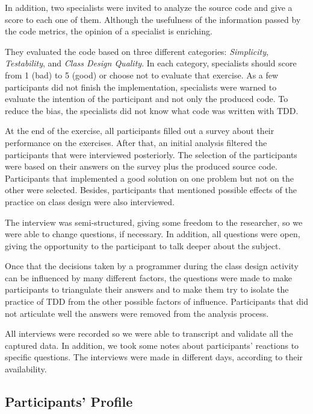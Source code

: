 \documentclass[conference]{IEEEtran}
\begin{document}
In addition, two specialists were invited to analyze the source code and give a score
to each one of them. Although the usefulness of the information passed by the code metrics,
the opinion of a specialist is enriching.

They evaluated the code based on three different categories: \textit{Simplicity}, \textit{Testability},
and \textit{Class Design Quality}. In each category, specialists should score from 1 (bad) to
5 (good) or choose not to evaluate that exercise. As a few participants did not finish the
implementation, specialists were warned to evaluate the intention of the participant and not
only the produced code.
To reduce the bias, the specialists did not know what code was written with TDD.

At the end of the exercise, all participants filled out a survey about their performance
on the exercises. After that, an initial analysis filtered the participants that
were interviewed posteriorly. The selection of the participants were based on
their answers on the survey plus the produced source code. Participants that implemented
a good solution on one problem but not on the other were selected. Besides, participants
that mentioned possible effects of the practice on class design were also interviewed.

The interview was semi-structured, giving some freedom to the researcher, so we were
able to change questions, if necessary. In addition, all questions were open, giving the
opportunity to the participant to talk deeper about the subject.

Once that the decisions taken by a programmer during the class design activity can be
influenced by many different factors, the questions were made to make participants
to triangulate their answers and to make them try to isolate the practice of TDD from
the other possible factors of influence. Participants that did not articulate well
the answers were removed from the analysis process.

All interviews were recorded so we were able to transcript and validate all
the captured data. In addition, we took some notes about participants' reactions
to specific questions. The interviews were made in different days,
according to their availability.

\subsection{Participants' Profile}
\label{sec:planejamento-participantes}
\end{document}
